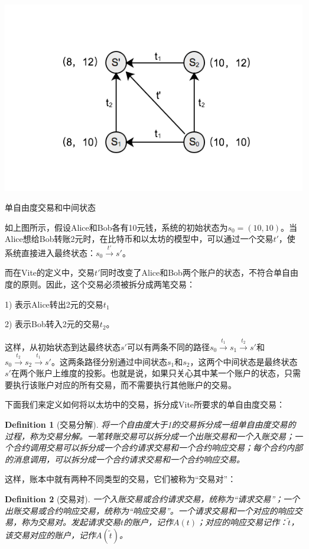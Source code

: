 \documentclass[UTF8,nofonts]{ctexart}
\makeatletter
\newtheorem{definition}{Definition}[section]
\newenvironment{figurehere}
 {\def\@captype{figure}}
 {}
\makeatother
\begin{document}
\begin{multicols}{2}
\begin{center}
\begin{figurehere}
\includegraphics[width=.8\linewidth]{image/tx-deg-of-free.png}
\caption{单自由度交易和中间状态}
\end{figurehere}
\end{center}

如上图所示，假设Alice和Bob各有10元钱，系统的初始状态为$s_{0} = (10, 10)$。当Alice想给Bob转账2元时，在比特币和以太坊的模型中，可以通过一个交易${t}'$，使系统直接进入最终状态：$s_{0} \overset{{t}'}{\rightarrow}{s}'$。

而在Vite的定义中，交易${t}'$同时改变了Alice和Bob两个账户的状态，不符合单自由度的原则。因此，这个交易必须被拆分成两笔交易：

1) 表示Alice转出2元的交易$t_{1}$

2) 表示Bob转入2元的交易$t_{2}$。

这样，从初始状态到达最终状态${s}'$可以有两条不同的路径$s_{0} \overset{t_{1}}{\rightarrow} s_{1} \overset{t_{2}}{\rightarrow} {s}'$和$s_{0} \overset{t_{2}}{\rightarrow} s_{2} \overset{t_{1}}{\rightarrow} {s}'$。这两条路径分别通过中间状态$s_{1}$和$s_{2}$，这两个中间状态是最终状态${s}'$在两个账户上维度的投影。也就是说，如果只关心其中某一个账户的状态，只需要执行该账户对应的所有交易，而不需要执行其他账户的交易。

下面我们来定义如何将以太坊中的交易，拆分成Vite所要求的单自由度交易：
\begin{definition}[交易分解]
将一个自由度大于1的交易拆分成一组单自由度交易的过程，称为交易分解。一笔转账交易可以拆分成一个出账交易和一个入账交易；一个合约调用交易可以拆分成一个合约请求交易和一个合约响应交易；每个合约内部的消息调用，可以拆分成一个合约请求交易和一个合约响应交易。
\end{definition}

这样，账本中就有两种不同类型的交易，它们被称为“交易对”：
\begin{definition}[交易对]
一个入账交易或合约请求交易，统称为“请求交易”；一个出账交易或合约响应交易，统称为“响应交易”。一个请求交易和一个对应的响应交易，称为交易对。发起请求交易$t$的账户，记作$A(t)$；对应的响应交易记作：$\widetilde{t}$，该交易对应的账户，记作$A(\widetilde{t})$。
\end{definition}


\end{multicols}
\end{document}
